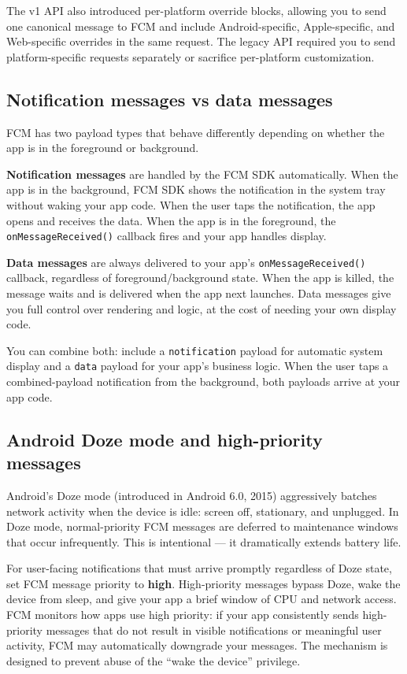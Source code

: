\documentclass[11pt,a4paper]{article}
\begin{document}
The v1 API also introduced per-platform override blocks, allowing you to send one canonical message to FCM and include Android-specific, Apple-specific, and Web-specific overrides in the same request. The legacy API required you to send platform-specific requests separately or sacrifice per-platform customization.

\subsection{Notification messages vs data messages}

FCM has two payload types that behave differently depending on whether the app is in the foreground or background.

\textbf{Notification messages} are handled by the FCM SDK automatically. When the app is in the background, FCM SDK shows the notification in the system tray without waking your app code. When the user taps the notification, the app opens and receives the data. When the app is in the foreground, the \texttt{onMessageReceived()} callback fires and your app handles display.

\textbf{Data messages} are always delivered to your app's \texttt{onMessageReceived()} callback, regardless of foreground/background state. When the app is killed, the message waits and is delivered when the app next launches. Data messages give you full control over rendering and logic, at the cost of needing your own display code.

You can combine both: include a \texttt{notification} payload for automatic system display and a \texttt{data} payload for your app's business logic. When the user taps a combined-payload notification from the background, both payloads arrive at your app code.

\subsection{Android Doze mode and high-priority messages}

Android's Doze mode (introduced in Android 6.0, 2015) aggressively batches network activity when the device is idle: screen off, stationary, and unplugged. In Doze mode, normal-priority FCM messages are deferred to maintenance windows that occur infrequently. This is intentional --- it dramatically extends battery life.

For user-facing notifications that must arrive promptly regardless of Doze state, set FCM message priority to \textbf{high}. High-priority messages bypass Doze, wake the device from sleep, and give your app a brief window of CPU and network access. FCM monitors how apps use high priority: if your app consistently sends high-priority messages that do not result in visible notifications or meaningful user activity, FCM may automatically downgrade your messages. The mechanism is designed to prevent abuse of the ``wake the device'' privilege.
\end{document}
